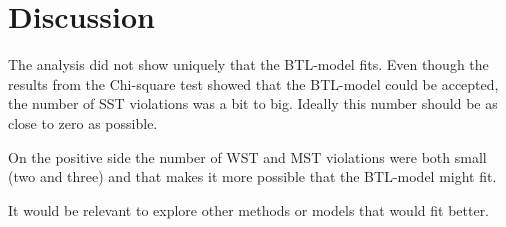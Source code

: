\section*{Discussion}
\label{Discussion}
%
The analysis did not show uniquely that the BTL-model fits. Even though the results from the Chi-square test showed that the BTL-model could be accepted, the number of SST violations was a bit to big. Ideally this number should be as close to zero as possible. 

On the positive side the number of WST and MST violations were both small (two and three) and that makes it more possible that the BTL-model might fit. 

It would be relevant to explore other methods or models that would fit better. 

